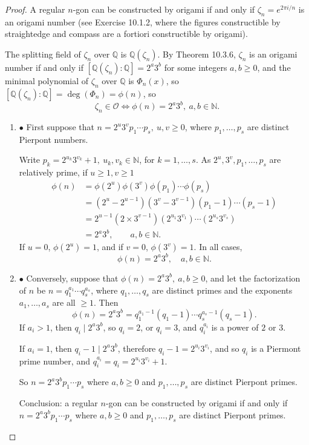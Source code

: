 \documentclass[11pt,a4paper]{article}
\newcommand{\be} {\begin{enumerate}}
\newcommand{\ee} {\end{enumerate}}
\newcommand{\Q}{\mathbb{Q}}
\newcommand{\N}{\mathbb{N}}
\begin{document}
\begin{proof}
A regular $n$-gon can be constructed by origami if and only if $\zeta_n = e^{2\pi i/n}$ is an origami number (see Exercise 10.1.2, where the figures constructible by straightedge and compass are a fortiori constructible by origami). 

The splitting field of $\zeta_n$ over $\Q$ is $\Q(\zeta_n)$.
By Theorem 10.3.6, $\zeta_n$ is an origami number if and only if $[\Q(\zeta_n):\Q] = 2^a 3 ^b$ for some integers $a,b \geq 0$, and the minimal polynomial of $\zeta_n$ over $\Q$ is $\Phi_n(x)$, so $[\Q(\zeta_n):\Q]  = \deg(\Phi_n) = \phi(n)$, so
$$\zeta_n \in {\mathscr O} \iff \phi(n)=2^a 3^b,\ a,b \in \N.$$
\be
\item[$\bullet$] First suppose that $n=2^u3^v p_1\cdots p_s, \ u,v \geq 0$, where $p_1,\ldots,p_s$ are distinct Pierpont numbers.

Write $p_k = 2^{u_k}3^{v_k}+1, \ u_k, v_k \in \N$, for $k=1,\ldots,s$. As $2^u, 3^v, p_1,\ldots,p_s$ are relatively prime, if $u\geq 1,v \geq 1$ 
\begin{align*}
\phi(n) &= \phi(2^u) \phi(3^v) \phi(p_1)\cdots \phi(p_s) \\
	&=  (2^u- 2^{u-1}) (3^v - 3^{v-1}) (p_1-1)\cdots(p_s-1)\\
	&= 2^{u-1} ( 2 \times 3^{v-1}) (2^{u_1}3^{v_1}) \cdots (2^{u_s}3^{v_s})\\
	&= 2^a 3^b,\qquad a,b \in \N.
\end{align*}
If $u=0$, $\phi(2^u) = 1$, and if $v=0$, $\phi(3^v) = 1$. In all cases,
$$ \phi(n)=2^a 3^b,\quad a,b \in \N.$$

\item[$\bullet$] Conversely, suppose that $\phi(n)=2^a 3^b,\ a,b \geq 0$, and let the factorization of $n$ be $n = q_1^{a_1}\cdots q_s^{a_s}$, where $q_1,\ldots,q_s$ are distinct primes and the exponents $a_1,\ldots, a_s$ are all $\geq 1$. Then
$$\phi(n) = 2^a 3^b = q_1^{a_1-1}(q_1-1)\cdots q_s^{a_s-1}(q_s-1).$$
If $a_i > 1$, then $q_i \mid 2^a 3^b$, so $q_i = 2$, or $q_i=3$, and $q_i^{a_i}$ is a power of $2$ or $3$.

If $a_i=1$, then $q_i-1 \mid 2^a 3^b$, therefore $q_i - 1 = 2^{u_i} 3^{v_i}$, and so $q_i$ is a Piermont prime number, and $q_i^{a_i} = q_i =2^{u_i} 3^{v_i}+1$.

So $n = 2^a 3^b p_1 \cdots p_s$ where $a,b\geq 0$ and $p_1,\ldots,p_s$ are distinct Pierpont primes.

Conclusion: a regular $n$-gon can be constructed by origami if and only if $n = 2^a 3^b p_1 \cdots p_s$ where $a,b\geq 0$ and $p_1,\ldots,p_s$ are distinct Pierpont primes.
\ee
\end{proof}
\end{document}
